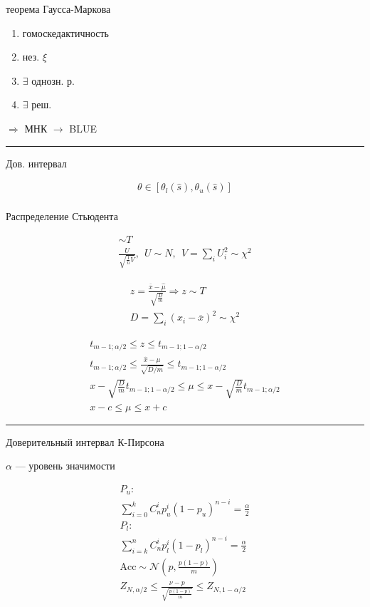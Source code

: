 \documentclass{book}
\begin{document}
теорема Гаусса-Маркова
\begin{enumerate}
    \item гомоскедактичность
    \item нез. $\xi$
    \item $\exists$ однозн. р.
    \item $\exists$ реш.
\end{enumerate}
$\Rightarrow$ МНК $\rightarrow$ BLUE

\hrule
Дов. интервал

\begin{gather*}
  \theta \in [\theta_l(\hat{s}), \theta_u(\hat{s})]\\
\end{gather*}

Распределение Стьюдента

\begin{gather*}
  \sim T\\
  \frac{U}{\sqrt{\frac{1}{n}V}},~~U\sim N,~~V=\sum_{i}^{} {U_i^2}\sim \chi^2
\end{gather*}

\begin{gather*}
  z=\frac{\overline{x}-\hat{\mu}}{\sqrt{\frac{D}{m}}} \Rightarrow
  z \sim T\\
  D = \sum_{i}^{} {(x_i-\overline{x})^2} \sim \chi^2
\end{gather*}

\begin{gather*}
  t_{m-1;\alpha/2}\leq z \leq t_{m-1;1-\alpha/2}\\
  t_{m-1;\alpha/2}\leq \frac{\hat{x}-\mu}{\sqrt{D/m}} \leq t_{m-1;1-\alpha/2}\\
  x-\sqrt{\frac{D}{m}}t_{m-1;1-\alpha/2} \leq \mu \leq x- \sqrt{\frac{D}{m}}t_{m-1;\alpha/2}\\
  x-c\leq \mu \leq x + c
\end{gather*}

\hrule
Доверительный интервал К-Пирсона

$\alpha$ --- уровень значимости

\begin{gather*}
    P_u:\\
    \sum_{i=0}^{k} {C^i_np^i_u(1-p_u)^{n-i}}=\frac{\alpha}{2}\\
    P_l:\\
    \sum_{i=k}^{n} {C^i_np^i_l(1-p_l)^{n-i}}=\frac{\alpha}{2}\\
    \mathrm{Acc} \sim \mathcal{N}\left(p, \frac{p(1-p)}{m}\right)\\
    Z_{N,\alpha/2} \leq \frac{\nu-p}{\sqrt{\frac{p(1-p)}{m}}}\leq Z_{N,1-\alpha/2}
\end{gather*}
\end{document}

